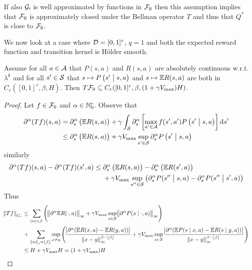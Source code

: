 If also $\mathcal{G_0}$ is well approximated by functions in $\mathcal{F}_0$
then this assumption implies that $\mathcal{F}_0$ is approximately closed
under the Bellman operator $T$ and thus that $Q^*$ is close to $\mathcal{F}_0$.

We now look at a case where $\mathcal{D}=[0,1]^r$, $q=1$ 
and both the expected reward function and transition kernel
is Hölder smooth.

\begin{prop}
  Assume for all $a \in \mathcal{A}$ that
  $P(s,a)$ and $R(s,a)$ are absolutely continuous w.r.t. $\lambda^k$
  and for all $s' \in \mathcal{S}$ that
  $s \mapsto P\left(s' \;\middle\vert\; s, a \right)$
  and $s \mapsto \mathbb{E} R(s, a)$
  are both in $C_r([0,1]^r, \beta, H)$.
  Then $T \mathcal{F}_0 \subseteq C_r([0,1]^r, \beta, (1 + \gamma V_{\max}) H)$.
\end{prop}
\begin{proof}
  Let $f \in \mathcal{F}_0$ and $\alpha \in \mathbb{N}_0^r$.
  Observe that
  \begin{align*}
    \partial^\alpha (Tf)(s, a)
    = & \; \partial^\alpha_s \left( \mathbb{E} R(s, a) \right)
    + \gamma \int_{\mathcal{S}}\partial^\alpha_s \left[ \max_{a' \in \mathcal{A}}
    f(s', a') P\left(s' \;\middle\vert\; s, a\right) \right] \mathrm{d} s' 
    \\ \leq & \; \partial^\alpha_s \left( \mathbb{E} R(s, a) \right)
    + \gamma V_{\max} \sup_{s' \in \mathcal{S}} \partial_s^\alpha
    P\left(s' \;\middle\vert\; s, a\right)
  \end{align*}
  similarly
  \begin{align*}
    \partial^\alpha (Tf)(s, a) - \partial^\alpha (Tf)(s', a)
    \leq & \; \partial^\alpha_s \left( \mathbb{E} R(s, a) \right)
    - \partial^\alpha_s \left( \mathbb{E} R(s', a) \right)
    \\ & \; + \gamma V_{\max} \sup_{s'' \in \mathcal{S}}
    \left( \partial_s^\alpha P(s'' \;\middle\vert\; s, a)
    - \partial_s^\alpha P(s'' \;\middle\vert\; s', a) \right)
  \end{align*}
  Thus
  \begin{align*}
    \norm{Tf}_{C_r} \leq & \; \sum_{\abs{\alpha}<\beta} \left(
      \norm{\partial^\alpha \mathbb{E} R(\cdot, a)}_\infty
      + \gamma V_{\max} \sup_{s \in \mathcal{S}} \norm{\partial^\alpha
    P(s \mid \cdot, a)}_\infty \right)
    \\ + & \; \sum_{\norm{\alpha}_1 = \lfloor\beta\rfloor} \sup_{x \neq y}
    \left(
      \frac{\abs{\partial^\alpha (\mathbb{E} R(x, a) - \mathbb{E} R(y, a))}}
      {\norm{x - y}_{\infty}^{\beta - \lfloor\beta\rfloor}}
      + \gamma V_{\max} \sup_{s \in \mathcal{S}} \frac{
      \abs{\partial^\alpha (\mathbb{E} P(s \mid x, a) - \mathbb{E} R(s \mid y, a))}}
      {\norm{x - y}_{\infty}^{\beta - \lfloor\beta\rfloor}}
    \right)
    \\ \leq & \; H + \gamma V_{\max} H = (1 + \gamma V_{\max}) H
  \end{align*}
  
\end{proof}



